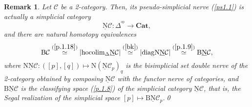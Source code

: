 \documentclass[]{amsart}
\newtheorem{remark}[theorem]{Remark}
\begin{document}
\begin{remark}\label{2-cat}{\em Let ${\ensuremath{\mathcal{C}}}$ be a 2-category. Then, its pseudo-simplicial nerve (\ref{ps1.1}) is actually a
simplicial category $${\ensuremath{\underline{\mathrm{N}}}}{\ensuremath{\mathcal{C}}}:\Delta^{\!^{\mathrm{op}}}\to{\ensuremath{\mathbf{Cat}}},$$ and there are natural homotopy
equivalences
$${\ensuremath{\mathrm{B}}}{\ensuremath{\mathcal{C}}}\overset{(\ref{p.1.18})}\simeq |{\ensuremath{\mathrm{hocolim}}}_\Delta{\ensuremath{\underline{\mathrm{N}}}}{\ensuremath{\mathcal{C}}}|\overset{(\ref{bk})}\simeq|{\ensuremath{\mathrm{diag}}}{\ensuremath{\mathrm{N}}}{\ensuremath{\underline{\mathrm{N}}}}{\ensuremath{\mathcal{C}}}|\overset{(\ref{p.1.9})}\simeq {\ensuremath{\mathrm{B}}}{\ensuremath{\underline{\mathrm{N}}}}{\ensuremath{\mathcal{C}}},$$
where ${\ensuremath{\mathrm{N}}}{\ensuremath{\underline{\mathrm{N}}}}{\ensuremath{\mathcal{C}}}: ([p],[q])\mapsto {\ensuremath{\mathrm{N}}}({\ensuremath{\underline{\mathrm{N}}}}{\ensuremath{\mathcal{C}}}_p)_q$ is the bisimplicial set {\em double nerve}
of the 2-category obtained by composing ${\ensuremath{\underline{\mathrm{N}}}}{\ensuremath{\mathcal{C}}}$ with the functor nerve of categories, and
${\ensuremath{\mathrm{B}}}{\ensuremath{\underline{\mathrm{N}}}}{\ensuremath{\mathcal{C}}}$ is the classifying space (\ref{p.1.8}) of the simplicial category ${\ensuremath{\underline{\mathrm{N}}}}{\ensuremath{\mathcal{C}}}$, that
is,  the Segal realization  of the simplicial space $[p]\mapsto {\ensuremath{\mathrm{B}}}{\ensuremath{\underline{\mathrm{N}}}}{\ensuremath{\mathcal{C}}}_p$.\qed }
\end{remark}
\end{document}

